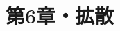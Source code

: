 \documentclass{ltjsarticle}
\title{第6章・拡散}
\date{\DTMnow}
\begin{document}
\maketitle



\hypertarget{targetofBackToTheToc}{}
\tableofcontents

\setcounter{section}{57}





\end{document}
